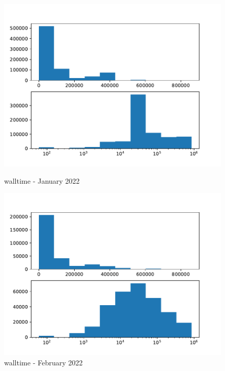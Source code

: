 \documentclass[a4paper]{article}
\begin{document}
\begin{figure}[H] 
  \begin{minipage}[b]{0.5\linewidth}
    \centering
    \includegraphics[width=1.11\linewidth]{MBSS/plot/Distribution/2022_01_walltime.pdf} 
    \caption{walltime - January 2022} 
    \vspace{4ex}
  \end{minipage}%
  \begin{minipage}[b]{0.5\linewidth}
    \centering
    \includegraphics[width=1.11\linewidth]{MBSS/plot/Distribution/2022_02_walltime.pdf} 
    \caption{walltime - February 2022} 
    \vspace{4ex}
  \end{minipage} 
  \begin{minipage}[b]{0.5\linewidth}

\end{minipage}
\end{figure}
\end{document}
